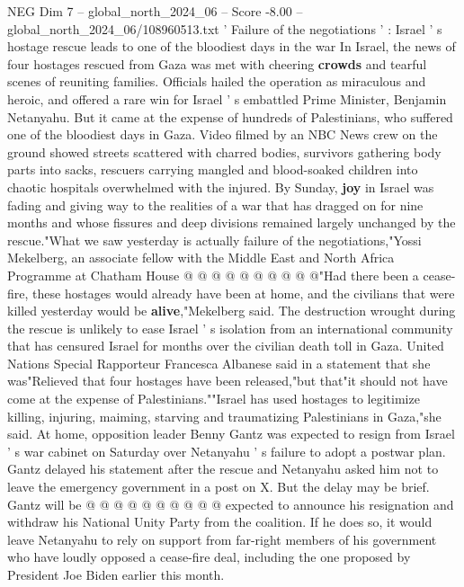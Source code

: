 \begin{textsample}{NEG Dim 7 – global\_north\_2024\_06 – Score -8.00 – global\_north\_2024\_06/108960513.txt}  \label{ex:f7_neg_136}
' Failure of the negotiations ' : Israel ' s hostage rescue leads to one of the bloodiest days in the war In Israel, the news of four hostages rescued from Gaza was met with cheering \textbf{crowds} and tearful scenes of reuniting families.
Officials hailed the operation as miraculous and heroic, and offered a rare win for Israel ' s embattled Prime Minister, Benjamin Netanyahu.
But it came at the expense of hundreds of Palestinians, who suffered one of the bloodiest days in Gaza.
Video filmed by an NBC News crew on the ground showed streets scattered with charred bodies, survivors gathering body parts into sacks, rescuers carrying mangled and blood-soaked children into chaotic hospitals overwhelmed with the injured.
By Sunday, \textbf{joy} in Israel was fading and giving way to the realities of a war that has dragged on for nine months and whose fissures and deep divisions remained largely unchanged by the rescue."What we saw yesterday is actually failure of the negotiations,"Yossi Mekelberg, an associate fellow with the Middle East and North Africa Programme at Chatham House @ @ @ @ @ @ @ @ @ @"Had there been a cease-fire, these hostages would already have been at home, and the civilians that were killed yesterday would be \textbf{alive},"Mekelberg said.
The destruction wrought during the rescue is unlikely to ease Israel ' s isolation from an international community that has censured Israel for months over the civilian death toll in Gaza.
United Nations Special Rapporteur Francesca Albanese said in a statement that she was"Relieved that four hostages have been released,"but that"it should not have come at the expense of Palestinians.""Israel has used hostages to legitimize killing, injuring, maiming, starving and traumatizing Palestinians in Gaza,"she said.
At home, opposition leader Benny Gantz was expected to resign from Israel ' s war cabinet on Saturday over Netanyahu ' s failure to adopt a postwar plan.
Gantz delayed his statement after the rescue and Netanyahu asked him not to leave the emergency government in a post on X.
But the delay may be brief.
Gantz will be @ @ @ @ @ @ @ @ @ @ expected to announce his resignation and withdraw his National Unity Party from the coalition.
If he does so, it would leave Netanyahu to rely on support from far-right members of his government who have loudly opposed a cease-fire deal, including the one proposed by President Joe Biden earlier this month.

\end{textsample}
